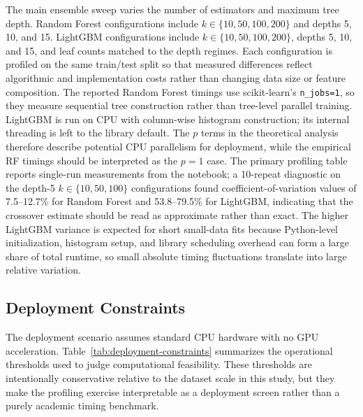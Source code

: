 \documentclass[11pt]{article}
\begin{document}
The main ensemble sweep varies the number of estimators and maximum tree depth. Random Forest configurations include $k \in \{10,50,100,200\}$ and depths 5, 10, and 15. LightGBM configurations include $k \in \{10,50,100,200\}$, depths 5, 10, and 15, and leaf counts matched to the depth regimes. Each configuration is profiled on the same train/test split so that measured differences reflect algorithmic and implementation costs rather than changing data size or feature composition. The reported Random Forest timings use scikit-learn's \texttt{n\_jobs=1}, so they measure sequential tree construction rather than tree-level parallel training. LightGBM is run on CPU with column-wise histogram construction; its internal threading is left to the library default. The $p$ terms in the theoretical analysis therefore describe potential CPU parallelism for deployment, while the empirical RF timings should be interpreted as the $p=1$ case. The primary profiling table reports single-run measurements from the notebook; a 10-repeat diagnostic on the depth-5 $k\in\{10,50,100\}$ configurations found coefficient-of-variation values of 7.5--12.7\% for Random Forest and 53.8--79.5\% for LightGBM, indicating that the crossover estimate should be read as approximate rather than exact. The higher LightGBM variance is expected for short small-data fits because Python-level initialization, histogram setup, and library scheduling overhead can form a large share of total runtime, so small absolute timing fluctuations translate into large relative variation.

\subsection{Deployment Constraints}
The deployment scenario assumes standard CPU hardware with no GPU acceleration. Table~\ref{tab:deployment-constraints} summarizes the operational thresholds used to judge computational feasibility. These thresholds are intentionally conservative relative to the dataset scale in this study, but they make the profiling exercise interpretable as a deployment screen rather than a purely academic timing benchmark.
\end{document}
